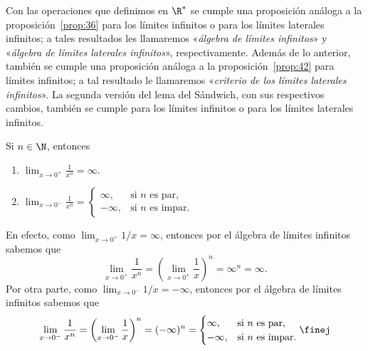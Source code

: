 \documentclass[12pt,a4paper]{book}
\begin{document}
    \begin{observacion}\label{obs:16}
        Con las operaciones que definimos en $\R^{*}$ se cumple una
        proposición análoga a la proposición~\ref{prop:36} para los límites infinitos o para los
        límites laterales infinitos; a tales resultados les llamaremos «\textit{álgebra de límites
        infinitos}» y «\textit{álgebra de límites laterales infinitos}», respectivamente. Además
        de lo anterior, también se cumple una proposición análoga a la proposición~\ref{prop:42}
        para límites infinitos; a tal resultado le llamaremos «\textit{criterio de los límites
        laterales infinitos}». La segunda versión del lema del Sándwich, con sus
        respectivos cambios, también se cumple para los límites infinitos o para los
        límites laterales infinitos.
    \end{observacion}

    \begin{ejemplo}\label{ejm:57}
        Si $n\in\N$, entonces
        \begin{enumerate}[nosep]
            \item $\lim_{x\to 0^{+}}\frac{1}{x^{n}}=\infty$.
            \item $\lim_{x\to 0^{-}}\frac{1}{x^{n}}=\begin{cases}\infty, & \text{si }n\text{ es par},\\ -\infty, & \text{si }n\text{ es impar}.\end{cases}$
        \end{enumerate}
        En efecto, como $\lim_{x\to 0^{+}}1/x=\infty$, entonces por el álgebra de límites
        infinitos sabemos que
        \begin{equation*}
            \lim_{x\to 0^{+}}\frac{1}{x^{n}}=\left(\lim_{x\to 0^{+}}\frac{1}{x}\right)^{n}=\infty^{n}=\infty.
        \end{equation*}
        Por otra parte, como $\lim_{x\to 0^{-}}1/x=-\infty$, entonces por el álgebra de límites
        infinitos sabemos que
        \begin{equation*}
            \lim_{x\to 0^{-}}\frac{1}{x^{n}}=\left(\lim_{x\to 0^{-}}\frac{1}{x}\right)^{n}=(-\infty)^{n}=\begin{cases}\infty, & \text{si }n\text{ es par},\\ -\infty, & \text{si }n\text{ es impar}.\end{cases}\finej
        \end{equation*}
    \end{ejemplo}
\end{document}

